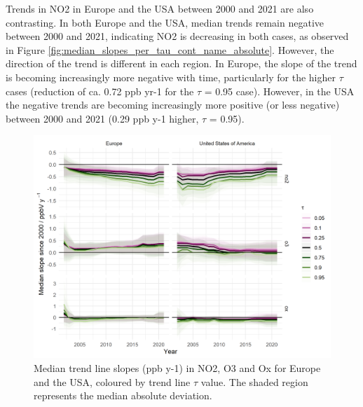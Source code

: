 \documentclass[journal abbreviation, manuscript]{copernicus}
\begin{document}
Trends in NO2 in Europe and the USA between 2000 and 2021 are also contrasting. In both Europe and the USA, median trends remain negative between 2000 and 2021, indicating NO2 is decreasing in both cases, as observed in Figure \ref{fig:median_slopes_per_tau_cont_name_absolute}. However, the direction of the trend is different in each region. In Europe, the slope of the trend is becoming increasingly more negative with time, particularly for the higher $\tau$ cases (reduction of ca. 0.72 ppb yr-1 for the $\tau$ = 0.95 case). However, in the USA the negative trends are becoming increasingly more positive (or less negative) between 2000 and 2021 (0.29 ppb y-1 higher, $\tau$ = 0.95). 


\begin{figure}[t]
\includegraphics[width=12cm]{plots/fixed_median_slopes_per_tau_continent_name.png}
\caption{Median trend line slopes (ppb y-1) in NO2, O3 and Ox for Europe and the USA, coloured by trend line $\tau$ value. The shaded region represents the median absolute deviation.}
\label{fig:median_slopes_per_tau_cont_name_trends}
\end{figure}
\end{document}
